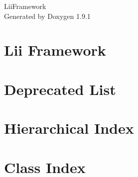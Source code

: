 \let\mypdfximage\pdfximage\def\pdfximage{\immediate\mypdfximage}\documentclass[twoside]{book}
\newcommand{\+}{\discretionary{\mbox{\scriptsize$\hookleftarrow$}}{}{}}
\newcommand{\clearemptydoublepage}{%
  \newpage{\pagestyle{empty}\cleardoublepage}%
}
\begin{document}
\raggedbottom

\hypersetup{pageanchor=false,
             bookmarksnumbered=true,
             pdfencoding=unicode
            }
\begin{titlepage}
\vspace*{7cm}
\begin{center}%
{\Large Lii\+Framework }\\
\vspace*{1cm}
{\large Generated by Doxygen 1.9.1}\\
\end{center}
\end{titlepage}
\clearemptydoublepage
{}
\tableofcontents
\clearemptydoublepage
{}
\hypersetup{pageanchor=true}

\chapter{Lii Framework}
\label{md__r_e_a_d_m_e}

\chapter{Deprecated List}
\label{deprecated}

\chapter{Hierarchical Index}

\chapter{Class Index}

\end{document}
